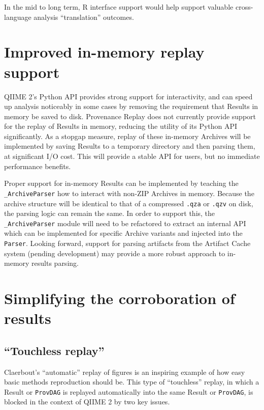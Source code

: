 In the mid to long term, R interface support would help support valuable
cross-language analysis “translation” outcomes.

\section{Improved in-memory replay support \parencite[Issue 22]{keefe_issues_2021}}
QIIME 2’s Python API provides strong support for interactivity, and can speed up
analysis noticeably in some cases by removing the requirement that Results in
memory be saved to disk. Provenance Replay does not currently provide support
for the replay of Results in memory, reducing the utility of its Python API
significantly. As a stopgap measure, replay of these in-memory Archives will be
implemented by saving Results to a temporary directory and then parsing them, at
significant I/O cost. This will provide a stable API for users, but no immediate
performance benefits.

Proper support for in-memory Results can be implemented by teaching the
\texttt{\_ArchiveParser} how to interact with non-ZIP Archives in memory. Because the
archive structure will be identical to that of a compressed \texttt{.qza} or \texttt{.qzv} on
disk, the parsing logic can remain the same. In order to support this, the
\texttt{\_ArchiveParser} module will need to be refactored to extract an internal API
which can be implemented for specific Archive variants and injected into the
\texttt{Parser}. Looking forward, support for parsing artifacts from the Artifact Cache
system (pending development) may provide a more robust approach to in-memory
results parsing.

\section{Simplifying the corroboration of results}

\subsection{“Touchless replay” \parencite[Issue 63]{keefe_issues_2021}}
\label{section:touchless_replay}

Claerbout’s “automatic” replay of figures is an inspiring example of how easy
basic methods reproduction should be. This type of “touchless” replay, in which
a Result or \texttt{ProvDAG} is replayed automatically into the same Result or \texttt{ProvDAG},
is blocked in the context of QIIME 2 by two key issues.


